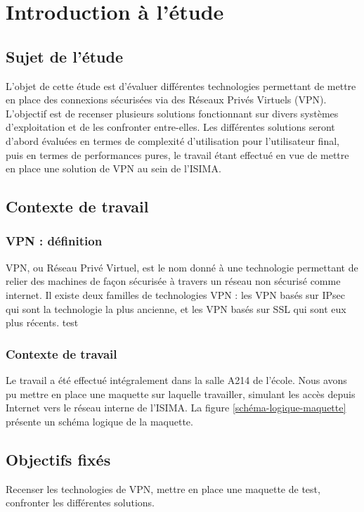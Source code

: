 \section{Introduction à l'étude}
\subsection{Sujet de l'étude}
L'objet de cette étude est d'évaluer différentes technologies permettant de mettre en place des connexions sécurisées via des Réseaux Privés Virtuels (VPN). L'objectif est de recenser plusieurs solutions fonctionnant sur divers systèmes d'exploitation et de les confronter entre-elles. Les différentes solutions seront d'abord évaluées en termes de complexité d'utilisation pour l'utilisateur final, puis en termes de performances pures, le travail étant effectué en vue de mettre en place une solution de VPN au sein de l'ISIMA.

\subsection{Contexte de travail}
\subsubsection{VPN : définition}
VPN, ou Réseau Privé Virtuel, est le nom donné à une technologie permettant de relier des machines de façon sécurisée à travers un réseau non sécurisé comme internet. Il existe deux familles de technologies VPN : les VPN basés sur IPsec qui sont la technologie la plus ancienne, et les VPN basés sur SSL qui sont eux plus récents. test

\subsubsection{Contexte de travail}
Le travail a été effectué intégralement dans la salle A214 de l'école. Nous avons pu mettre en place une maquette sur laquelle travailler, simulant les accès depuis Internet vers le réseau interne de l'ISIMA. La figure \ref{schéma-logique-maquette} présente un schéma logique de la maquette.

\subsection{Objectifs fixés}
Recenser les technologies de VPN, mettre en place une maquette de test, confronter les différentes solutions.

\pagebreak
